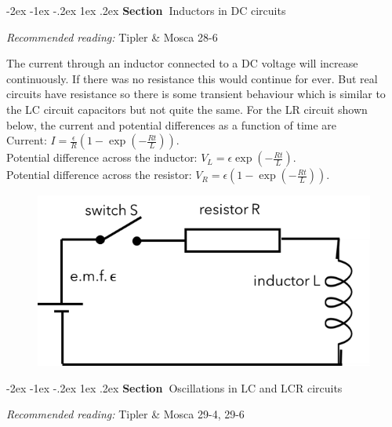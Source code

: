 \documentclass[
]{book}
\makeatletter
\renewcommand\section{%
\@startsection{section}{1}{\z@}%
              {-2ex \@plus -1ex \@minus -.2ex}%
              {1ex \@plus .2ex}%
              {\sffamily\bfseries\large\noindent Section~}}
\numberwithin{equation}{section}
\makeatother
\begin{document}
\hypertarget{inductors-in-dc-circuits}{%
\section{Inductors in DC circuits}\label{inductors-in-dc-circuits}}

\emph{Recommended reading:} Tipler \& Mosca 28-6

The current through an inductor connected to a DC voltage will increase
continuously. If there was no resistance this would continue for ever.
But real circuits have resistance so there is some transient behaviour
which is similar to the LC circuit capacitors but not quite the same.
For the LR circuit shown below, the current and potential differences as
a function of time are\\

Current:
\(I = \frac{\epsilon}{R} \left(1 - \exp\left(-\frac{Rt}{L}\right) \right)\).\\

Potential difference across the inductor:
\(V_L = \epsilon \exp⁡\left(- \frac{Rt}{L} \right)\).\\

Potential difference across the resistor:
\(V_R = \epsilon \left (1 - \exp⁡ \left( - \frac{Rt}{L} \right) \right)\).

\begin{figure}

{\centering \includegraphics[width=0.7\linewidth]{Figures/LR_circuit} 

}

\end{figure}

\hypertarget{oscillations-in-lc-and-lcr-circuits}{%
\section{Oscillations in LC and LCR circuits}\label{oscillations-in-lc-and-lcr-circuits}}

\emph{Recommended reading:} Tipler \& Mosca 29-4, 29-6
\end{document}
